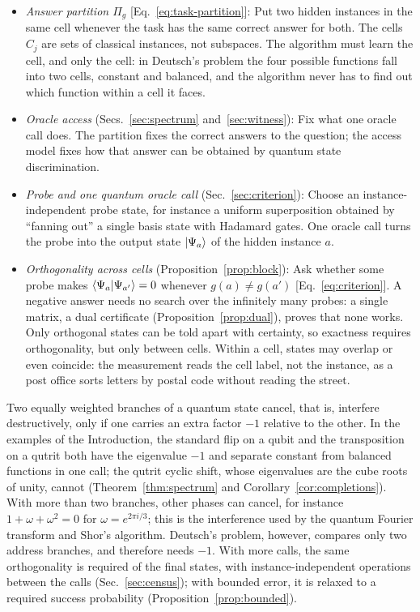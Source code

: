 \documentclass[
  aps,
  pra,
  reprint,
  nofootinbib
]{revtex4-2}
\begin{document}
\begin{itemize}
\item
\emph{Answer partition \(\Pi_g\)} [Eq.~\eqref{eq:task-partition}]:
Put two hidden instances in the same cell whenever the task has the same
correct answer for both. The cells \(C_j\) are sets of classical instances,
not subspaces. The algorithm must learn the cell, and only the cell: in
Deutsch's problem the four possible functions fall into two cells,
constant and balanced, and the algorithm never has to find out which
function within a cell it faces.

\item
\emph{Oracle access} (Secs.~\ref{sec:spectrum} and~\ref{sec:witness}):
Fix what one oracle call does. The partition fixes the correct answers to
the question; the access model fixes how that answer can be obtained by
quantum state discrimination.

\item
\emph{Probe and one quantum oracle call} (Sec.~\ref{sec:criterion}):
Choose an instance-independent probe state, for instance a uniform
superposition obtained by ``fanning out'' a single basis state with
Hadamard gates. One oracle call turns the probe into the output state
\(\ket{\Psi_a}\) of the hidden instance \(a\).

\item
\emph{Orthogonality across cells} (Proposition~\ref{prop:block}):
Ask whether some probe makes \(\braket{\Psi_a|\Psi_{a'}}=0\) whenever
\(g(a)\ne g(a')\) [Eq.~\eqref{eq:criterion}]. A negative answer needs no
search over the infinitely many probes: a single matrix, a dual certificate
(Proposition~\ref{prop:dual}), proves that none works. Only orthogonal
states can be told apart with certainty, so exactness requires
orthogonality, but only between cells. Within a cell, states may overlap or
even coincide: the measurement reads the cell label, not the instance, as a
post office sorts letters by postal code without reading the street.
\end{itemize}

Two equally weighted branches of a quantum state cancel, that is, interfere
destructively, only if one carries an extra factor \(-1\) relative to the
other. In the examples of the Introduction, the standard flip on a qubit
and the transposition on a qutrit both have the eigenvalue \(-1\) and
separate constant from balanced functions in one call; the qutrit cyclic
shift, whose eigenvalues are the cube roots of unity, cannot
(Theorem~\ref{thm:spectrum} and Corollary~\ref{cor:completions}). With
more than two branches, other phases can cancel, for instance
\(1+\omega+\omega^2=0\) for \(\omega=e^{2\pi i/3}\); this is the interference
used by the quantum Fourier transform and Shor's algorithm. Deutsch's
problem, however, compares only two address branches, and therefore needs
\(-1\). With more calls, the same orthogonality is required of the final states, with
instance-independent operations between the calls (Sec.~\ref{sec:census});
with bounded error, it is relaxed to a required success probability
(Proposition~\ref{prop:bounded}).
\end{document}
